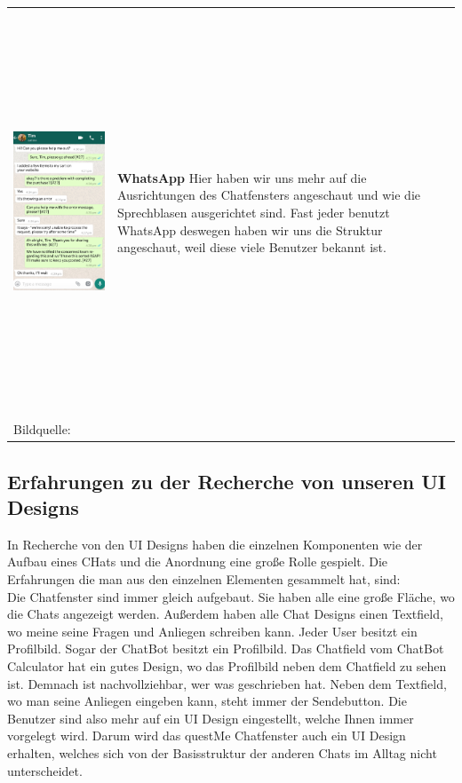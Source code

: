 \begin{tabular}{C{6cm}  L{7cm}}
    \includegraphics[width=\linewidth, height=12cm]{bilder/research pic/Tim Whatsapp.png} & \textbf{WhatsApp} \newline
    Hier haben wir uns mehr auf die Ausrichtungen des Chatfensters angeschaut und wie die Sprechblasen
    ausgerichtet sind. Fast jeder benutzt WhatsApp deswegen haben wir uns die Struktur angeschaut,
    weil diese viele Benutzer bekannt ist.                                                                              \\
    Bildquelle:\cite{timwhatsApp} \newline
\end{tabular}

\subsection{Erfahrungen zu der Recherche von unseren UI Designs}
In Recherche von den UI Designs haben die einzelnen Komponenten wie der Aufbau eines CHats und 
die Anordnung eine große Rolle gespielt. Die Erfahrungen die man aus den einzelnen Elementen gesammelt hat,
sind:
\\

\noindent Die Chatfenster sind immer gleich aufgebaut. 
Sie haben alle eine große Fläche, wo die Chats angezeigt werden. 
Außerdem haben alle Chat Designs einen Textfield, wo meine seine Fragen und Anliegen schreiben kann. 
Jeder User besitzt ein Profilbild. Sogar der ChatBot besitzt ein Profilbild. 
Das Chatfield vom ChatBot Calculator hat ein gutes Design, wo das Profilbild neben dem Chatfield zu sehen ist.
Demnach ist nachvollziehbar, wer was geschrieben hat. 
Neben dem Textfield, wo man seine Anliegen eingeben kann, steht immer der Sendebutton.
Die Benutzer sind also mehr auf ein UI Design eingestellt, welche Ihnen immer vorgelegt wird.
Darum wird das questMe Chatfenster auch ein UI Design erhalten, welches sich von der 
Basisstruktur der anderen Chats im Alltag nicht unterscheidet.



